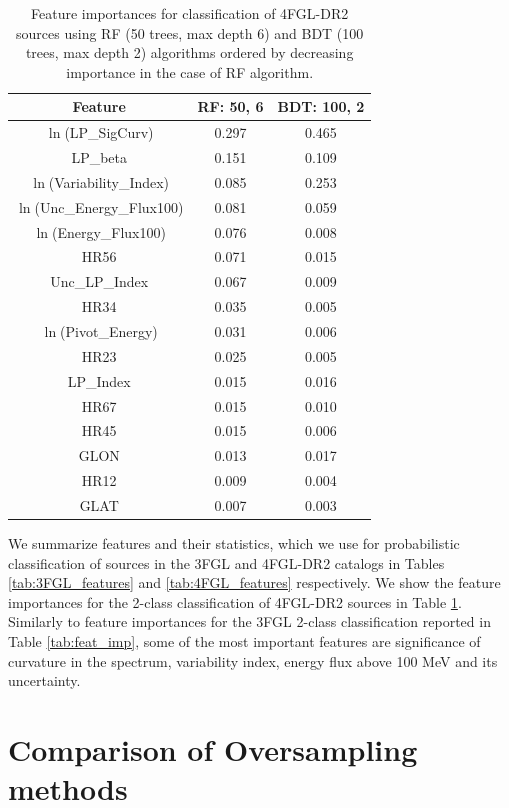 \begin{table}[!h]
\tiny
\centering
\renewcommand{\tabcolsep}{1mm}
\renewcommand{\arraystretch}{1}

\begin{tabular}{c c c}
\hline
\hline
Feature & RF: 50, 6& BDT: 100, 2\\
\hline
{ $\ln$(LP\_SigCurv)}&  0.297  & 0.465   \\
{LP\_beta}&0.151&0.109\\
{ $\ln$(Variability\_Index)} &0.085& 0.253   \\
$\ln$(Unc\_Energy\_Flux100)& 0.081&0.059  \\
$\ln$(Energy\_Flux100) & 0.076&0.008   \\
HR56&0.071& 0.015  \\
Unc\_LP\_Index & 0.067&0.009  \\
HR34& 0.035&0.005  \\
$\ln$(Pivot\_Energy)&0.031&0.006\\
HR23 &0.025& 0.005     \\
 LP\_Index& 0.015&0.016  \\
HR67&0.015&0.010\\
HR45&0.015&0.006\\
GLON&0.013&0.017\\
HR12&0.009&0.004\\
GLAT&0.007&0.003\\
\hline
\end{tabular}
\vspace{2mm}
\caption{Feature importances for classification of 4FGL-DR2 sources using
RF (50 trees, max depth 6) and BDT (100 trees, max depth 2) algorithms
ordered by decreasing importance 
in the case of RF algorithm.
}
\label{tab:feat_imp2}
\end{table}



We summarize features and their statistics,
which we use for probabilistic classification of sources in the 3FGL and 4FGL-DR2 catalogs
in Tables \ref{tab:3FGL_features} and \ref{tab:4FGL_features} respectively. 
We show the feature importances for the 2-class classification of 4FGL-DR2 sources in Table \ref{tab:feat_imp2}.
Similarly to feature importances for the 3FGL 2-class classification reported in Table \ref{tab:feat_imp}, 
some of the most important features are significance of curvature in the spectrum, variability index, energy flux above 100 MeV and its uncertainty.

\section{Comparison of Oversampling methods}

